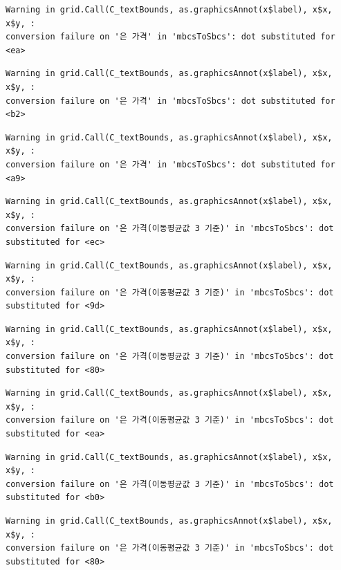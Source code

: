 \documentclass[
  letterpaper,
  DIV=11,
  numbers=noendperiod]{scrreprt}
\begin{document}
\begin{verbatim}
Warning in grid.Call(C_textBounds, as.graphicsAnnot(x$label), x$x, x$y, :
conversion failure on '은 가격' in 'mbcsToSbcs': dot substituted for <ea>
\end{verbatim}

\begin{verbatim}
Warning in grid.Call(C_textBounds, as.graphicsAnnot(x$label), x$x, x$y, :
conversion failure on '은 가격' in 'mbcsToSbcs': dot substituted for <b2>
\end{verbatim}

\begin{verbatim}
Warning in grid.Call(C_textBounds, as.graphicsAnnot(x$label), x$x, x$y, :
conversion failure on '은 가격' in 'mbcsToSbcs': dot substituted for <a9>
\end{verbatim}

\begin{verbatim}
Warning in grid.Call(C_textBounds, as.graphicsAnnot(x$label), x$x, x$y, :
conversion failure on '은 가격(이동평균값 3 기준)' in 'mbcsToSbcs': dot
substituted for <ec>
\end{verbatim}

\begin{verbatim}
Warning in grid.Call(C_textBounds, as.graphicsAnnot(x$label), x$x, x$y, :
conversion failure on '은 가격(이동평균값 3 기준)' in 'mbcsToSbcs': dot
substituted for <9d>
\end{verbatim}

\begin{verbatim}
Warning in grid.Call(C_textBounds, as.graphicsAnnot(x$label), x$x, x$y, :
conversion failure on '은 가격(이동평균값 3 기준)' in 'mbcsToSbcs': dot
substituted for <80>
\end{verbatim}

\begin{verbatim}
Warning in grid.Call(C_textBounds, as.graphicsAnnot(x$label), x$x, x$y, :
conversion failure on '은 가격(이동평균값 3 기준)' in 'mbcsToSbcs': dot
substituted for <ea>
\end{verbatim}

\begin{verbatim}
Warning in grid.Call(C_textBounds, as.graphicsAnnot(x$label), x$x, x$y, :
conversion failure on '은 가격(이동평균값 3 기준)' in 'mbcsToSbcs': dot
substituted for <b0>
\end{verbatim}

\begin{verbatim}
Warning in grid.Call(C_textBounds, as.graphicsAnnot(x$label), x$x, x$y, :
conversion failure on '은 가격(이동평균값 3 기준)' in 'mbcsToSbcs': dot
substituted for <80>
\end{verbatim}
\end{document}
